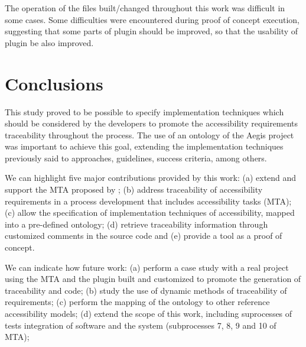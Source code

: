 \documentclass[10pt, conference, compsocconf]{IEEEtran}
\begin{document}
The operation of the files built/changed throughout this work was
difficult in some cases. Some difficulties were encountered during proof of concept execution, 
suggesting that some parts of plugin should be improved, so that the usability of
plugin be also improved.



\section{Conclusions}

This study proved to be possible to specify implementation techniques which should
be considered by the developers to promote the accessibility requirements traceability throughout the process. 
The use of an ontology of the Aegis project \cite{aegis:13} was important to achieve this goal, extending the
implementation techniques previously said to approaches, guidelines, success criteria, among others.


We can highlight five major contributions provided by this
work: (a) extend and support the MTA proposed by \cite{maia:10}; (b) address traceability of accessibility requirements in a process
   development that includes accessibility tasks (MTA); (c) allow the specification of implementation techniques of accessibility,
   mapped into a pre-defined ontology; (d) retrieve traceability information through customized comments in the source code and (e) 
provide a tool as a proof of concept.
   

We can indicate how future work: (a) perform a case study with a real project using the MTA and the plugin
   built and customized to promote the generation of traceability and code; (b) study the use of dynamic methods of
   traceability of requirements; (c) perform the mapping of the ontology to other reference
   accessibility models; (d) extend the scope of this work, including suprocesses of tests
   integration of software and the system (subprocesses 7, 8, 9 and 10 of
   MTA);






%






\end{document}
